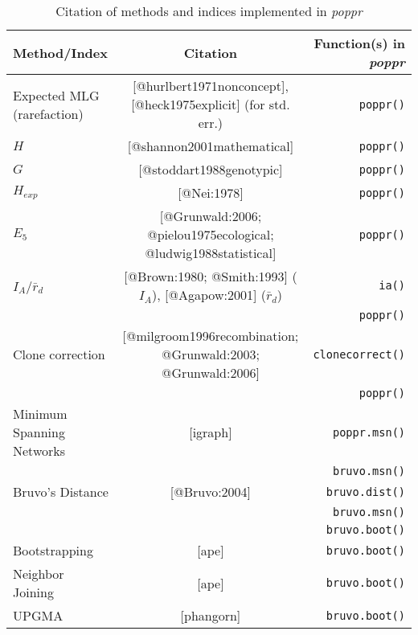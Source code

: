 \begin{sidewaystable}[ph!]
\begin{tabular}{lcr}
\hline
Method/Index & Citation & Function(s) in \textit{poppr} \\  
\hline
Expected MLG (rarefaction) & [@hurlbert1971nonconcept], [@heck1975explicit] (for std. err.) & \texttt{poppr()} \\ 
\hline
$H$ & [@shannon2001mathematical] & \texttt{poppr()} \\
\hline
$G$ & [@stoddart1988genotypic] & \texttt{poppr()} \\
\hline
$H_{exp}$ & [@Nei:1978] & \texttt{poppr()} \\
\hline
$E_{5}$ & [@Grunwald:2006; @pielou1975ecological; @ludwig1988statistical] & \texttt{poppr()} \\
\hline
$I_A$/$\bar{r}_d$ & [@Brown:1980; @Smith:1993] ($I_A$), [@Agapow:2001] ($\bar{r}_d$) & \texttt{ia()} \\
 & & \texttt{poppr()} \\
\hline
Clone correction & [@milgroom1996recombination; @Grunwald:2003; @Grunwald:2006] & \texttt{clonecorrect()} \\
 & & \texttt{poppr()}\\
\hline
\hline
Minimum Spanning Networks & [igraph] & \texttt{poppr.msn()} \\
 & & \texttt{bruvo.msn()} \\
Bruvo's Distance & [@Bruvo:2004] & \texttt{bruvo.dist()} \\
 & & \texttt{bruvo.msn()} \\
 & & \texttt{bruvo.boot()} \\
\hline
Bootstrapping & [ape] & \texttt{bruvo.boot()} \\
\hline
Neighbor Joining & [ape] & \texttt{bruvo.boot()} \\
\hline
UPGMA & [phangorn] & \texttt{bruvo.boot()} \\
\hline
\end{tabular}
\caption{Citation of methods and indices implemented in \textit{poppr}}
\label{tab:poppr4}
\end{sidewaystable}